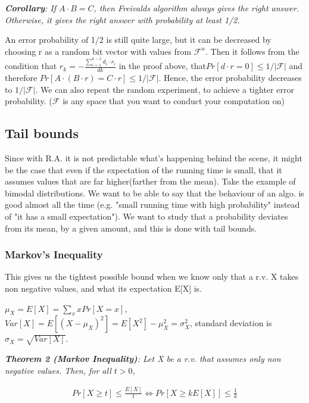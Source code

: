 \documentclass[11pt]{article}
\begin{document}
\medskip
\textit{\textbf{Corollary}: If $A \cdotp B = C$, then Freivalds algorithm always gives the right answer. Otherwise, it gives the right answer with probability at least 1/2.}
\medskip

An error probability of 1/2 is still quite large, but it can be decreased by choosing r as a random bit vector with values from $\mathcal{F}^n$. Then it follows from the condition that $r_k =  -\frac{\sum_{i=1}^{k-1}d_i \cdotp r_i}{dk}$ in the proof above, that$Pr[d \cdotp r = 0] \leq 1/|\mathcal{F}|$ and therefore $Pr[A \cdotp (B \cdotp r) = C \cdotp r] \leq 1/|\mathcal{F}|$. Hence, the error probability decreases to $1/|\mathcal{F}|$. We can also repeat the random experiment, to achieve a tighter error probability. ($\mathcal{F}$ is any space that you want to conduct your computation on)

\subsection{Tail bounds}
Since with R.A. it is not predictable what's happening behind the scene, it might be the case that even if the expectation of the running time is small, that it assumes values that are far higher(farther from the mean). Take the example of bimodal distributions. We want to be able to say that the behaviour of an algo. is good almost all the time (e.g. "small running time with high probability" instead of "it has a small expectation"). We want to study that a probability deviates from its mean, by a given amount, and this is done with tail bounds. 
   
\subsubsection{Markov's Inequality}
This gives us the tightest possible bound when we know only that a r.v. X takes non negative values, and what its expectation E[X] is.

 $\mu_X = E[X] = \sum_{x}xPr[X = x]$, $Var[X] = E[(X-\mu_X)^2] = E[X^2] - \mu_X^2 = \sigma_X^2$, standard deviation is $\sigma_X = \sqrt{Var[X]}$.

\textit{\textbf{Theorem 2 (Markov Inequality)}: Let X be a r.v. that assumes only non negative values. Then, for all $t > 0$, }

\begin{equation}
\begin{split}
  Pr[X \geq t] \leq \frac{E[X]}{t} \Leftrightarrow  Pr[X \geq kE[X]] \leq \frac{1}{k}  
 \end{split}
\end{equation}
\end{document}

